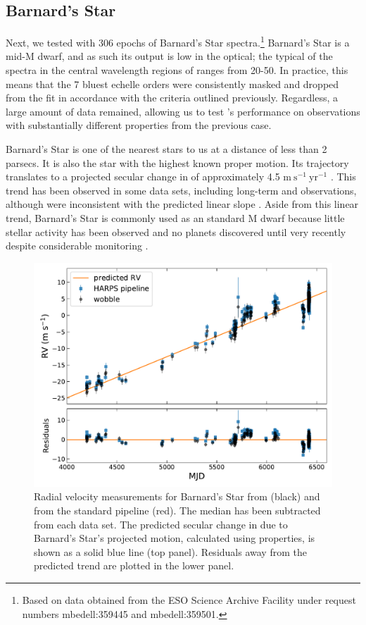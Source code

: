 \documentclass[modern]{aastex62}
\newcommand{\Mdwarf}{Barnard's Star\xspace} %
\begin{document}
\subsection{\Mdwarf}
\label{s:Mdwarf}

Next, we tested \wobble with 306 epochs of \Mdwarf spectra.\footnote{Based on data obtained from the ESO Science Archive Facility under request numbers mbedell:359445 and mbedell:359501.}
\Mdwarf is a mid-M dwarf, and as such its output is low in the optical; the typical \SNR of the spectra in the central wavelength regions of \HARPS ranges from 20-50.
In practice, this means that the 7 bluest echelle orders were consistently masked and dropped from the fit in accordance with the \SNR criteria outlined previously.
Regardless, a large amount of data remained, allowing us to test \wobble's performance on observations with substantially different properties from the previous case.

\Mdwarf is one of the nearest stars to us at a distance of less than 2 parsecs.
It is also the star with the highest known proper motion.
Its trajectory translates to a projected secular change in \RV of approximately 4.5 $\mathrm{m}~\mathrm{s}^{-1}~\mathrm{yr}^{-1}$ \citep{Kurster2003}.
This trend has been observed in some data sets, including long-term \HARPS and  observations, although  \RVs were inconsistent with the predicted linear slope \citep{Kurster2003, Bonfils2013, Choi2013, Montet2014}.
Aside from this linear trend, \Mdwarf is commonly used as an \RV standard M dwarf because little stellar activity has been observed and no planets discovered until very recently despite considerable \RV monitoring \citep{Ribas2018}.

\begin{figure}
\centering
\includegraphics[width=5in]{barnards_rvs}
\caption{Radial velocity measurements for \Mdwarf from \wobble (black) and from the standard \HARPS pipeline (red). The median \RV has been subtracted from each data set. The predicted secular change in \RV due to \Mdwarf's projected motion, calculated using \gaia properties, is shown as a solid blue line (top panel). Residuals away from the predicted trend are plotted in the lower panel. }
\label{fig:barnards_rvs}
\end{figure}
\end{document}
